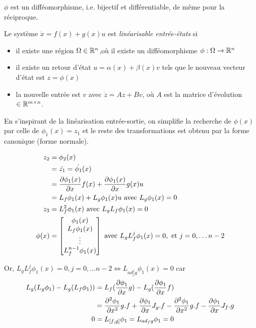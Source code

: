 \documentclass[main.tex]{subfiles}
\begin{document}
$\phi$ est un difféomorphisme, i.e. bijectif et différentiable, de même pour la réciproque.\\

\begin{thm}
  Le système $\dot{x} = f(x) + g(x)u$ est \emph{linéarisable entrée-états} si
  \begin{itemize}
  \item il existe une région $\Omega \in \R^n$,où il existe un difféomorphisme $\phi:\Omega\rightarrow\R^n$
  \item il existe un retour d'état $u=\alpha(x) + \beta(x)v$ tels que le nouveau vecteur d'état est $z=\phi(x)$
    \item  la nouvelle entrée est $v$ avec $\dot{z} = Az+Bv$,
    où $A$ est la  matrice d'évolution $\in \R^{m \times n}$.
\end{itemize}
\end{thm}

En s'inspirant de la linéarisation entrée-sortie, on simplifie la recherche de $\phi(x)$ par celle de $\phi_1(x)=z_1$ et le reste des transformations est obtenu par la forme canonique (forme normale).

\begin{align*}
z_2 & = \phi_2(x) \\
& = \dot{z_1} = \dot{\phi_1}(x) \\
& = \derivp[\phi_1(x)]{x}f(x) + \derivp[\phi_1(x)]{x}g(x)u \\
& = L_f\phi_1(x) + L_g\phi_1(x)u \text{ avec } L_g\phi_1(x) = 0 \\
z_3 & = L_f^2 \phi_1(x) \text{ avec } L_gL_f\phi_1(x) = 0 \\
\phi(x) & = \vect{\phi_1(x) \\ L_f\phi_1(x) \\ \vdots \\ L_f^{n-1} \phi_1(x)} \text{ avec } L_gL_f^j \phi_1(x) = 0,\text{ et } j = 0,\dots n-2
\end{align*}

Or, $ L_gL_f^j \phi_1(x) = 0, j = 0,\dots n-2 \Leftrightarrow L_{ad_f^j g} \phi_1(x) = 0 $ car 
\begin{align*}
L_g(L_g\phi_1) - L_g(L_f\phi_1)) & = L_f(\derivp[\phi_1]{x}g)-L_g(\derivp[\phi_1]{x}f) \\
& = \derivp[^2\phi_1]{x^2}g.f + \derivp[\phi_1]{x}J_g.f - \derivp[^2 \phi_1]{x^2}g.f - \derivp[\phi_1]{x}J_f.g \\
0 & = L_{[f,g]}\phi_1 = L_{ad_f g} \phi_1 = 0
\end{align*}
\end{document}
